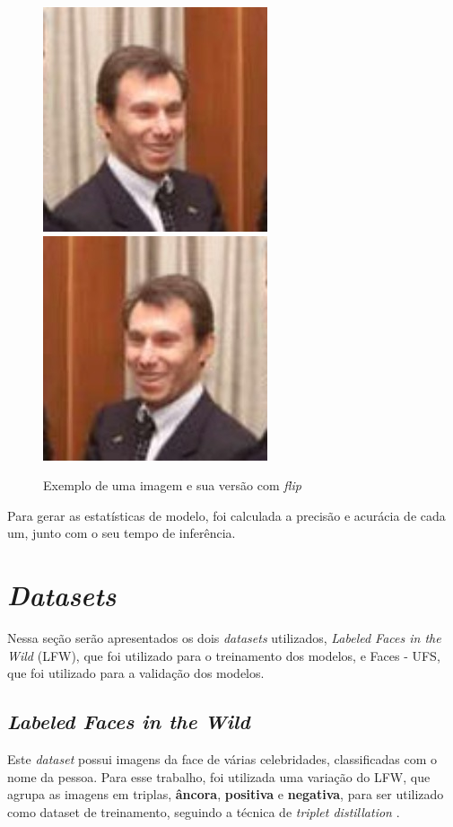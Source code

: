 \begin{figure}[htb]
	\begin{center}
		\includegraphics[scale=0.5]{Imagens/exemplo_flip_01}
		\includegraphics[scale=0.5]{Imagens/exemplo_flip_02}
	\end{center}
	\caption {\label{exemplo_flip_lfw}Exemplo de uma imagem e sua versão com \textit{flip}}
\end{figure}

Para gerar as estatísticas de modelo, foi calculada a precisão e acurácia de cada um, junto com o seu tempo de
inferência.


\section{\textit{Datasets}}\label{sec_datasets}
Nessa seção serão apresentados os dois \textit{datasets} utilizados, \textit{Labeled Faces in the Wild} (LFW),
que foi utilizado para o treinamento dos modelos, e Faces - UFS, que foi utilizado para a validação dos modelos.

\subsection{\textit{Labeled Faces in the Wild}}
Este \textit{dataset} possui imagens da face de várias celebridades, classificadas com o nome da pessoa.
Para esse trabalho, foi utilizada uma variação do LFW, que agrupa as imagens em triplas, \textbf{âncora},
\textbf{positiva} e \textbf{negativa}, para ser utilizado como dataset de treinamento, seguindo a técnica
de \textit{triplet distillation} \cite{triplet_distillation_face_recognition}.


